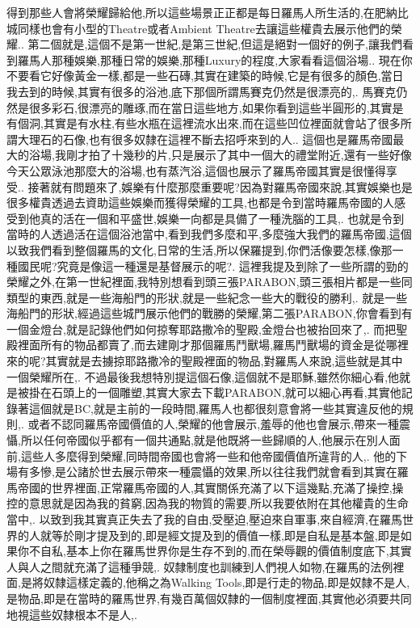\documentclass{book}
\begin{document}
得到那些人會將榮耀歸給他,所以這些場景正正都是每日羅馬人所生活的,在肥納比城同樣也會有小型的Theatre或者Ambient Theatre去讓這些權貴去展示他們的榮耀..
第二個就是,這個不是第一世紀,是第三世紀,但這是絕對一個好的例子,讓我們看到羅馬人那種娛樂,那種日常的娛樂,那種Luxury的程度,大家看看這個浴場..
現在你不要看它好像黃金一樣,都是一些石磚,其實在建築的時候,它是有很多的顏色,當日我去到的時候,其實有很多的浴池,底下那個所謂馬賽克仍然是很漂亮的,.
馬賽克仍然是很多彩石,很漂亮的雕琢,而在當日這些地方,如果你看到這些半圓形的,其實是有個洞,其實是有水柱,有些水瓶在這裡流水出來,而在這些凹位裡面就會站了很多所謂大理石的石像,也有很多奴隸在這裡不斷去招呼來到的人..
這個也是羅馬帝國最大的浴場,我剛才拍了十幾秒的片,只是展示了其中一個大的禮堂附近,還有一些好像今天公眾泳池那麼大的浴場,也有蒸汽浴,這個也展示了羅馬帝國其實是很懂得享受..
接著就有問題來了,娛樂有什麼那麼重要呢?因為對羅馬帝國來說,其實娛樂也是很多權貴透過去資助這些娛樂而獲得榮耀的工具,也都是令到當時羅馬帝國的人感受到他真的活在一個和平盛世,娛樂一向都是具備了一種洗腦的工具,.
也就是令到當時的人透過活在這個浴池當中,看到我們多麼和平,多麼強大我們的羅馬帝國,這個以致我們看到整個羅馬的文化,日常的生活,所以保羅提到,你們活像要怎樣,像那一種國民呢?究竟是像這一種還是基督展示的呢?.
這裡我提及到除了一些所謂的勁的榮耀之外,在第一世紀裡面,我特別想看到頭三張PARABON,頭三張相片都是一些同類型的東西,就是一些海船門的形狀,就是一些紀念一些大的戰役的勝利,.
就是一些海船門的形狀,經過這些城門展示他們的戰勝的榮耀,第二張PARABON,你會看到有一個金燈台,就是記錄他們如何掠奪耶路撒冷的聖殿,金燈台也被抬回來了,.
而把聖殿裡面所有的物品都賣了,而去建剛才那個羅馬鬥獸場,羅馬鬥獸場的資金是從哪裡來的呢?其實就是去擄掠耶路撒冷的聖殿裡面的物品,對羅馬人來說,這些就是其中一個榮耀所在,.
不過最後我想特別提這個石像,這個就不是耶穌,雖然你細心看,他就是被掛在石頭上的一個雕塑,其實大家去下載PARABON,就可以細心再看,其實他記錄著這個就是BC,就是主前的一段時間,羅馬人也都很刻意會將一些其實違反他的規則,.
或者不認同羅馬帝國價值的人,榮耀的他會展示,羞辱的他也會展示,帶來一種震懾,所以任何帝國似乎都有一個共通點,就是他既將一些歸順的人,他展示在別人面前,這些人多麼得到榮耀,同時間帝國也會將一些和他帝國價值所違背的人,.
他的下場有多慘,是公諸於世去展示帶來一種震懾的效果,所以往往我們就會看到其實在羅馬帝國的世界裡面,正常羅馬帝國的人,其實關係充滿了以下這幾點,充滿了操控,操控的意思就是因為我的貧窮,因為我的物質的需要,所以我要依附在其他權貴的生命當中,.
以致到我其實真正失去了我的自由,受壓迫,壓迫來自軍事,來自經濟,在羅馬世界的人就等於剛才提及到的,即是經文提及到的價值一樣,即是自私是基本盤,即是如果你不自私,基本上你在羅馬世界你是生存不到的,而在榮辱觀的價值制度底下,其實人與人之間就充滿了這種爭競,.
奴隸制度也訓練到人們視人如物,在羅馬的法例裡面,是將奴隸這樣定義的,他稱之為Walking Tools,即是行走的物品,即是奴隸不是人,是物品,即是在當時的羅馬世界,有幾百萬個奴隸的一個制度裡面,其實他必須要共同地視這些奴隸根本不是人,.
\end{document}
